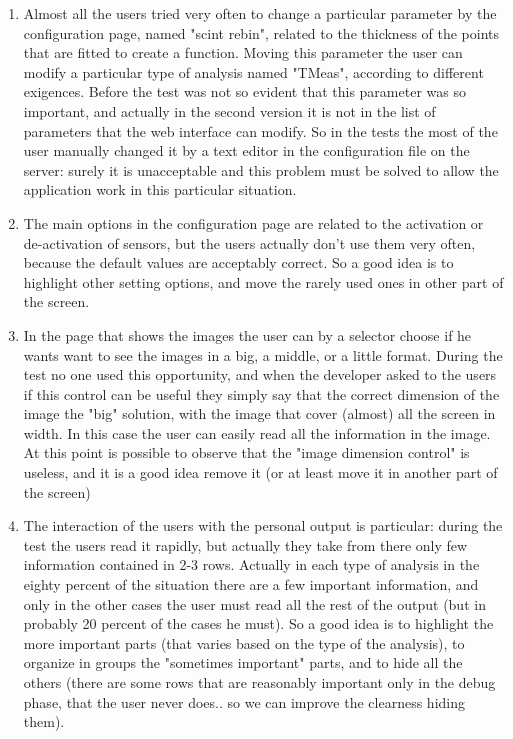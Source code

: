 \begin{enumerate}

\item
Almost all the users tried very often to change a particular parameter by the configuration page, named "scint rebin", related to the thickness of the points that are fitted to create a function. Moving this parameter the user can modify a particular type of analysis named "TMeas", according to different exigences. Before the test was not so evident that this parameter was so important, and actually in the second version it is not in the list of parameters that the web interface can modify. So in the tests the most of the user manually changed it by a text editor in the configuration file on the server: surely it is unacceptable and this problem must be solved to allow the application work in this particular situation.

\item 
The main options in the configuration page are related to the activation or de-activation of sensors, but the users actually don't use them very often, because  the default values are acceptably correct. So a good idea is to highlight other setting options, and move the rarely used ones in other part of the screen.

\item
In the page that shows the images the user can by a selector choose if he wants want to see the images in a big, a middle, or a little format. During the test no one used this opportunity, and when the developer asked to the users if this control can be useful they simply say that the correct dimension of the image the "big" solution, with the image that cover (almost) all the screen in width. In this case the user can easily read all the information in the image. At this point is possible to observe that the "image dimension control" is useless, and it is a good idea remove it (or at least move it in another part of the screen)   

\item
The interaction of the users with the personal output is particular: during the test the users read it rapidly, but actually they take from there only few information contained in 2-3 rows. Actually in each type of analysis in the eighty percent of the situation there are a few important information, and only in the other cases the user must read all the rest of the output (but in probably 20 percent of the cases he must). So a good idea is to highlight the more important parts (that varies based on the type of the analysis), to organize in groups the "sometimes important" parts, and to hide all the others (there are some rows that are reasonably important only in the debug phase, that the user never does.. so we can improve the clearness hiding them).


\end{enumerate}
